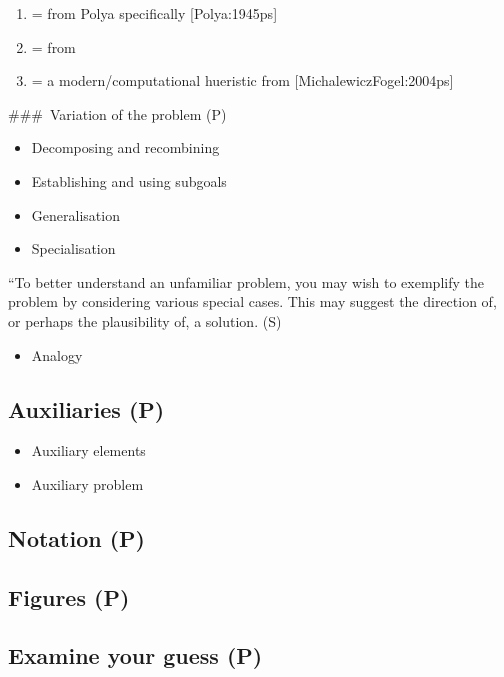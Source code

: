\documentclass[
  a4paper,
  DIV=11,
  numbers=noendperiod,
  oneside]{scrreprt}
\providecommand{\tightlist}{%
  \setlength{\itemsep}{0pt}\setlength{\parskip}{0pt}}
\begin{document}
\begin{enumerate}
\def\labelenumi{(\Alph{enumi})}
\setcounter{enumi}{15}
\tightlist
\item
  = from Polya specifically {[}Polya:1945ps{]}
\item
  = from
\item
  = a modern/computational hueristic from {[}MichalewiczFogel:2004ps{]}
\end{enumerate}

\#\#\#~Variation of the problem (P)

\begin{itemize}
\tightlist
\item
  Decomposing and recombining
\item
  Establishing and using subgoals
\item
  Generalisation
\item
  Specialisation
\end{itemize}

``To better understand an unfamiliar problem, you may wish to exemplify
the problem by considering various special cases. This may suggest the
direction of, or perhaps the plausibility of, a solution.\textbar{} (S)

\begin{itemize}
\tightlist
\item
  Analogy
\end{itemize}

\subsection{Auxiliaries (P)}\label{auxiliaries-p}

\begin{itemize}
\tightlist
\item
  Auxiliary elements
\item
  Auxiliary problem
\end{itemize}

\subsection{Notation (P)}\label{notation-p}

\subsection{Figures (P)}\label{figures-p}

\subsection{Examine your guess (P)}\label{examine-your-guess-p}
\end{document}
